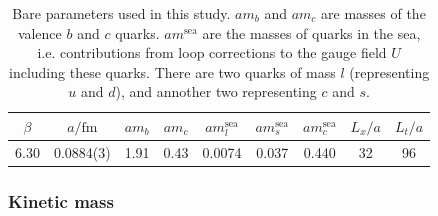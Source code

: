 \begin{table}
\begin{center}
 \begin{tabular}{||c c c c c c c c c||} 
 \hline
 $\beta$ & $a/\text{fm}$ & $am_b$ & $am_c$ & $am_l^{\text{sea}}$ & $am_s^{\text{sea}}$ & $am_c^{\text{sea}}$ & $L_x/a$ & $L_t/a$  \\ [0.5ex] 
 \hline\hline
 6.30 & 0.0884(3) & 1.91 & 0.43 & 0.0074 & 0.037 & 0.440 & 32 & 96 \\ [1ex] 
 \hline
\end{tabular}
\caption{Bare parameters used in this study. $am_b$ and $am_c$ are masses of the valence $b$ and $c$ quarks. $am^{\text{sea}}$ are the masses of quarks in the sea, i.e. contributions from
loop corrections to the gauge field $U$ including these quarks. There are two quarks of mass $l$ (representing $u$ and $d$), and annother two representing $c$ and $s$.}
\end{center}
\end{table}

\subsubsection{Kinetic mass}
\label{sec:kinetic_mass}

